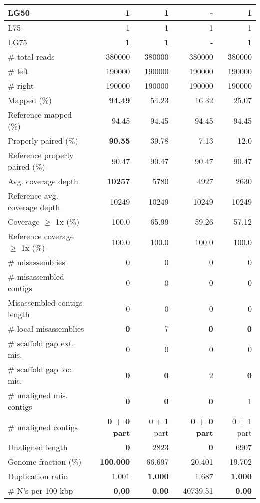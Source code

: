\documentclass[12pt,a4paper]{article}
\begin{document}
\begin{table}[ht]
\begin{center}
\begin{tabular}{|l*{4}{|r}|}
LG50 & {\bf 1} & {\bf 1} & - & {\bf 1} \\ \hline
L75 & 1 & 1 & 1 & 1 \\ \hline
LG75 & {\bf 1} & {\bf 1} & - & {\bf 1} \\ \hline
\# total reads & 380000 & 380000 & 380000 & 380000 \\ \hline
\# left & 190000 & 190000 & 190000 & 190000 \\ \hline
\# right & 190000 & 190000 & 190000 & 190000 \\ \hline
Mapped (\%) & {\bf 94.49} & 54.23 & 16.32 & 25.07 \\ \hline
Reference mapped (\%) & 94.45 & 94.45 & 94.45 & 94.45 \\ \hline
Properly paired (\%) & {\bf 90.55} & 39.78 & 7.13 & 12.0 \\ \hline
Reference properly paired (\%) & 90.47 & 90.47 & 90.47 & 90.47 \\ \hline
Avg. coverage depth & {\bf 10257} & 5780 & 4927 & 2630 \\ \hline
Reference avg. coverage depth & 10249 & 10249 & 10249 & 10249 \\ \hline
Coverage $\geq$ 1x (\%) & 100.0 & 65.99 & 59.26 & 57.12 \\ \hline
Reference coverage $\geq$ 1x (\%) & 100.0 & 100.0 & 100.0 & 100.0 \\ \hline
\# misassemblies & 0 & 0 & 0 & 0 \\ \hline
\# misassembled contigs & 0 & 0 & 0 & 0 \\ \hline
Misassembled contigs length & 0 & 0 & 0 & 0 \\ \hline
\# local misassemblies & {\bf 0} & 7 & {\bf 0} & {\bf 0} \\ \hline
\# scaffold gap ext. mis. & 0 & 0 & 0 & 0 \\ \hline
\# scaffold gap loc. mis. & {\bf 0} & {\bf 0} & 2 & {\bf 0} \\ \hline
\# unaligned mis. contigs & {\bf 0} & {\bf 0} & {\bf 0} & 1 \\ \hline
\# unaligned contigs & {\bf 0 + 0 part} & 0 + 1 part & {\bf 0 + 0 part} & 0 + 1 part \\ \hline
Unaligned length & {\bf 0} & 2823 & {\bf 0} & 6907 \\ \hline
Genome fraction (\%) & {\bf 100.000} & 66.697 & 20.401 & 19.702 \\ \hline
Duplication ratio & 1.001 & {\bf 1.000} & 1.687 & {\bf 1.000} \\ \hline
\# N's per 100 kbp & {\bf 0.00} & {\bf 0.00} & 40739.51 & {\bf 0.00} \\ \hline

\end{tabular}
\end{center}
\end{table}
\end{document}
